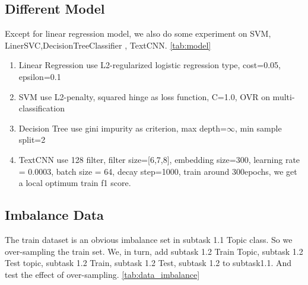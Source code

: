 

\subsection{Different Model}
\label{sec:different_model}

Except for linear regression model, we also do some experiment on SVM, LinerSVC,DecisionTreeClassifier , TextCNN. \ref{tab:model}

\begin{enumerate}
    \item Linear Regression use L2-regularized logistic regression type, cost=0.05, epsilon=0.1
    \item SVM use L2-penalty, squared hinge as loss function, C=1.0, OVR on multi-classification
    \item Decision Tree use gini impurity as criterion, max depth=$\infty$, min sample split=2
    \item TextCNN use 128 filter, filter size=[6,7,8], embedding size=300, learning rate = 0.0003, batch size = 64, decay step=1000, train around 300epochs, we get a local optimum train f1 score.
\end{enumerate}



\subsection{Imbalance Data}
\label{sec:impalance_data}

The train dataset is an obvious imbalance set in subtask 1.1 Topic class. So we over-sampling the train set. We, in turn, add subtask 1.2 Train Topic, subtask 1.2 Test topic, subtask 1.2 Train, subtask 1.2 Test, subtask 1.2 to subtask1.1. And test the effect of over-sampling. \ref{tab:data_imbalance}


